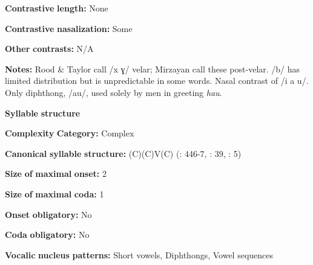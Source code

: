 \begin{styleBody}
\textbf{Contrastive} \textbf{length:} None
\end{styleBody}

\begin{styleBody}
\textbf{Contrastive} \textbf{nasalization:} Some
\end{styleBody}

\begin{styleBody}
\textbf{Other} \textbf{contrasts:} N/A
\end{styleBody}

\begin{styleBody}
\textbf{Notes:} Rood \& Taylor call /x ɣ/ velar; Mirzayan call these post-velar. /b/ has limited distribution but is unpredictable in some words. Nasal contrast of /i a u/. Only diphthong, /au/, used solely by men in greeting \textit{hau}.
\end{styleBody}

\begin{styleBody}
\textbf{Syllable} \textbf{structure}
\end{styleBody}

\begin{styleBody}
\textbf{Complexity} \textbf{Category:} Complex
\end{styleBody}

\begin{styleBody}
\textbf{Canonical} \textbf{syllable} \textbf{structure:} (C)(C)V(C) (\citealt{TaylorRood1996}: 446-7, \citealt{Mirzayan2010}: 39, \citealt{Ingham2003}: 5)
\end{styleBody}

\begin{styleBody}
\textbf{Size} \textbf{of} \textbf{maximal} \textbf{onset:} 2
\end{styleBody}

\begin{styleBody}
\textbf{Size} \textbf{of} \textbf{maximal} \textbf{coda:} 1
\end{styleBody}

\begin{styleBody}
\textbf{Onset} \textbf{obligatory:} No
\end{styleBody}

\begin{styleBody}
\textbf{Coda} \textbf{obligatory:} No
\end{styleBody}

\begin{styleBody}
\textbf{Vocalic} \textbf{nucleus} \textbf{patterns:} Short vowels, Diphthongs, Vowel sequences
\end{styleBody}

